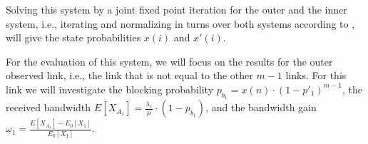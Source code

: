 Solving this system by a joint fixed point iteration for the outer and the inner system, i.e., iterating and normalizing in turns over both systems according to , will give the state probabilities $x(i)$ and $x'(i)$.%

For the evaluation of this system, we will focus on the results for the outer observed link, i.e., the link that is not equal to the other $m-1$ links. For this link we will investigate the blocking probability $p_{b_1} = x(n)\cdot (1-p'_1)^{m-1}$, the received bandwidth $E[X_{A_1}] = \frac{\lambda_1}{\mu}\cdot (1-p_{b_1})$, and the bandwidth gain $\omega_1=\frac{E[X_{A_1}]-E_0[X_1]}{E_0[X_1]}$.
